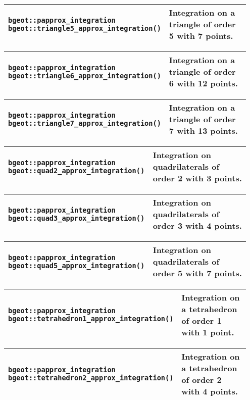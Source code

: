 \begin{center}
\begin{tabular}{|m{0.55\linewidth}|m{0.4\linewidth}|} \hline
{\tt bgeot::papprox\_integration bgeot::triangle5\_approx\_integration()} & Integration on a triangle of order 5 with 7 points. \\ \hline
\end{tabular}
\begin{tabular}{|m{0.55\linewidth}|m{0.4\linewidth}|} \hline
{\tt bgeot::papprox\_integration bgeot::triangle6\_approx\_integration()} & Integration on a triangle of order 6 with 12 points. \\ \hline
\end{tabular} 
\begin{tabular}{|m{0.55\linewidth}|m{0.4\linewidth}|} \hline
{\tt bgeot::papprox\_integration bgeot::triangle7\_approx\_integration()} & Integration on a triangle of order 7 with 13 points. \\ \hline
\end{tabular} 
\begin{tabular}{|m{0.55\linewidth}|m{0.4\linewidth}|} \hline
{\tt bgeot::papprox\_integration bgeot::quad2\_approx\_integration()} & Integration on quadrilaterals of order 2 with 3 points. \\ \hline
\end{tabular} 
\begin{tabular}{|m{0.55\linewidth}|m{0.4\linewidth}|} \hline
{\tt bgeot::papprox\_integration bgeot::quad3\_approx\_integration()} & Integration on quadrilaterals of order 3 with 4 points. \\ \hline
\end{tabular} 
\begin{tabular}{|m{0.55\linewidth}|m{0.4\linewidth}|} \hline
{\tt bgeot::papprox\_integration bgeot::quad5\_approx\_integration()} & Integration on quadrilaterals of order 5 with 7 points. \\ \hline
\end{tabular} 
\begin{tabular}{|m{0.55\linewidth}|m{0.4\linewidth}|} \hline
{\tt bgeot::papprox\_integration bgeot::tetrahedron1\_approx\_integration()} & Integration on a tetrahedron of order 1 with 1 point. \\ \hline
\end{tabular} 
\begin{tabular}{|m{0.55\linewidth}|m{0.4\linewidth}|} \hline
{\tt bgeot::papprox\_integration bgeot::tetrahedron2\_approx\_integration()} & Integration on a tetrahedron of order 2 with 4 points. \\ \hline

\end{tabular}
\end{center}
